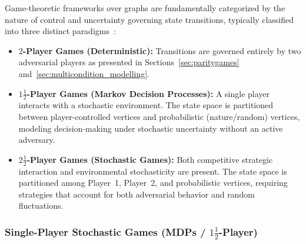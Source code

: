 \documentclass{article}
\begin{document}
Game-theoretic frameworks over graphs are fundamentally categorized by the nature of control and uncertainty governing state transitions, typically classified into three distinct paradigms~\cite{Chatterjee:2012Survey}:
\begin{itemize}
    \item \textbf{$2$-Player Games (Deterministic):} Transitions are governed entirely by two adversarial players as presented in Sections~\ref{sec:paritygames} and~\ref{sec:multicondition_modelling}.
    \item \textbf{$1\frac{1}{2}$-Player Games (Markov Decision Processes):} A single player interacts with a stochastic environment. The state space is partitioned between player-controlled vertices and probabilistic (nature/random) vertices, modeling decision-making under stochastic uncertainty without an active adversary.
    \item \textbf{$2\frac{1}{2}$-Player Games (Stochastic Games):} Both competitive strategic interaction and environmental stochasticity are present. The state space is partitioned among Player~1, Player~2, and probabilistic vertices, requiring strategies that account for both adversarial behavior and random fluctuations.
\end{itemize}

\subsubsection{Single-Player Stochastic Games (MDPs / $1\frac{1}{2}$-Player)}\label{sec:mdps}
\end{document}
